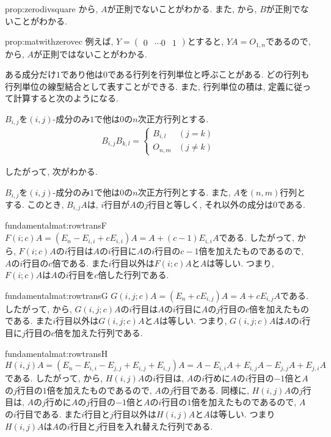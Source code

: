 \begin{proofof}{prop:zerodivsquare}
  から,
  $A$が正則でないことがわかる.
  また, から,
  $B$が正則でないことがわかる.
\end{proofof}

\begin{proofof}{prop:matwithzerovec}
  例えば, $Y=\begin{pmatrix}0&\cdots0&1\end{pmatrix}$とすると,
  $YA=O_{1,n}$であるので,
  から,
  $A$が正則ではないことがわかる.
\end{proofof}


ある成分だけ$1$であり他は$0$である行列を行列単位と呼ぶことがある.
どの行列も行列単位の線型結合として表すことができる.
また, 行列単位の積は,
定義に従って計算すると次のようになる.
\begin{lemma}
  $B_{i,j}$を$(i,j)$-成分のみ$1$で他は$0$の$n$次正方行列とする.
  \begin{align*}
    B_{i,j}B_{k,l}=
    \begin{cases}
      B_{i,l}&(j=k)\\
      O_{n,m}&(j\neq k)
    \end{cases}
  \end{align*}
\end{lemma}
したがって, 次がわかる.
\begin{lemma}
  \label{lemma:matrixunit:rightprod}
  $B_{i,j}$を$(i,j)$-成分のみ$1$で他は$0$の$n$次正方行列とする.
  また, $A$を$(n,m)$行列とする.
  このとき,
  $B_{i,j}A$は,
  $i$行目が$A$の$j$行目と等しく, それ以外の成分は$0$である.  
\end{lemma}

\begin{proofof*}{fundamentalmat:rowtrans}{F}
  $F(i;c)A=(E_n-E_{i,i}+cE_{i,i})A=A+(c-1)E_{i,i}A$である.
  したがって,
  から,
  $F(i;c)A$の$i$行目は$A$の$i$行目に$A$の$i$行目の$c-1$倍を加えたものであるので,
  $A$の$i$行目の$c$倍である.
  また$i$行目以外は$F(i;c)A$と$A$は等しい.
  つまり,
  $F(i;c)A$は$A$の$i$行目を$c$倍した行列である.
\end{proofof*}
\begin{proofof*}{fundamentalmat:rowtrans}{G}
  $G(i,j;c)A=(E_n+cE_{i,j})A=A+cE_{i,j}A$である.
  したがって,
  から,
  $G(i,j;c)A$の$i$行目は$A$の$i$行目に$A$の$j$行目の$c$倍を加えたものである.
  また$i$行目以外は$G(i,j;c)A$と$A$は等しい.
  つまり, $G(i,j;c)A$は$A$の$i$行目に$j$行目の$c$倍を加えた行列である.
\end{proofof*}
\begin{proofof*}{fundamentalmat:rowtrans}{H}
  $H(i,j)A=(E_n-E_{i,i}-E_{j,j}+E_{i,j}+E_{i,j})A=A-E_{i,i}A+E_{i,j}A-E_{j,j}A+E_{j,i}A$
  である.
  したがって,
  から,
  $H(i,j)A$の$i$行目は,
  $A$の$i$行めに$A$の$i$行目の$-1$倍と$A$の$j$行目の$1$倍を加えたものであるので,
  $A$の$j$行目である.
  同様に, $H(i,j)A$の$j$行目は,
  $A$の$j$行めに$A$の$j$行目の$-1$倍と$A$の$i$行目の$1$倍を加えたものであるので,
  $A$の$i$行目である.
  また$i$行目と$j$行目以外は$H(i,j)A$と$A$は等しい.
  つまり$H(i,j)A$は$A$の$i$行目と$j$行目を入れ替えた行列である.
\end{proofof*}

